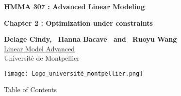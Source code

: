\documentclass[unknownkeysallowed]{beamer}
\begin{document}



\begin{frame}
\bigskip
\bigskip
\begin{center}{
\LARGE\color{marron}
\textbf{HMMA 307 : Advanced Linear Modeling}
\textbf{ }\\
\vspace{0.5cm}
}

\color{marron}
\textbf{Chapter 2 : Optimization under constraints}
\end{center}

\vspace{0.25cm}

\begin{center}
\textbf{Delage Cindy, \ Hanna Bacave \ and \ Ruoyu Wang \\}
\faGithub\href{ https://github.com/hannabacave/MLA}{ Linear Model Advanced}
\\
\vspace{0.5cm}
Université de Montpellier \\
\end{center}

\centering
\texttt{[image: Logo\_université\_montpellier.png]}

\end{frame}






\begin{frame}{Table of Contents}
\tableofcontents[hideallsubsections]
\end{frame}



\end{document}
